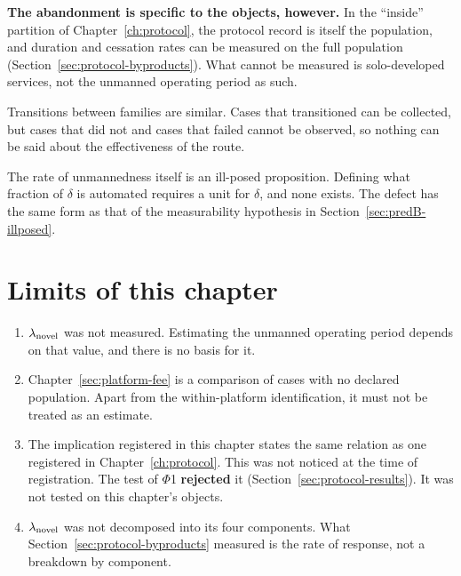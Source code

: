 \textbf{The abandonment is specific to the objects, however.} In the ``inside'' partition of
Chapter~\ref{ch:protocol}, the protocol record is itself the population, and duration and
cessation rates can be measured on the full population
(Section~\ref{sec:protocol-byproducts}). What cannot be measured is solo-developed services,
not the unmanned operating period as such.

Transitions between families are similar. Cases that transitioned can be collected, but cases
that did not and cases that failed cannot be observed, so nothing can be said about the
effectiveness of the route.

The rate of unmannedness itself is an ill-posed proposition. Defining what fraction of
$\delta$ is automated requires a unit for $\delta$, and none exists. The defect has the same
form as that of the measurability hypothesis in Section~\ref{sec:predB-illposed}.

\section{Limits of this chapter}

\begin{enumerate}[label=(\arabic*)]
\item $\lambda_{\rm novel}$ was not measured. Estimating the unmanned operating period
depends on that value, and there is no basis for it.

\item Chapter~\ref{sec:platform-fee} is a comparison of cases with no declared population.
Apart from the within-platform identification, it must not be treated as an estimate.

\item The implication registered in this chapter states the same relation as one registered
in Chapter~\ref{ch:protocol}. This was not noticed at the time of registration. The test of
$\Phi$1 \textbf{rejected} it (Section~\ref{sec:protocol-results}). It was not tested on this
chapter's objects.

\item $\lambda_{\rm novel}$ was not decomposed into its four components. What
Section~\ref{sec:protocol-byproducts} measured is the rate of response, not a breakdown by
component.
\end{enumerate}
